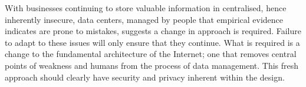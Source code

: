 \documentclass[twocolumn,english]{article}
\begin{document}
With businesses continuing to store valuable information in centralised, hence inherently insecure, data centers, managed by people that empirical evidence indicates are prone to mistakes, suggests a change in approach is required. Failure
to adapt to these issues will only ensure that they continue. What is required is a change to the fundamental architecture
of the Internet; one that removes central points of weakness and humans
from the process of data management. This fresh approach should clearly
have security and privacy inherent within the design. 

%
%
%
%
%
%
%
\end{document}
